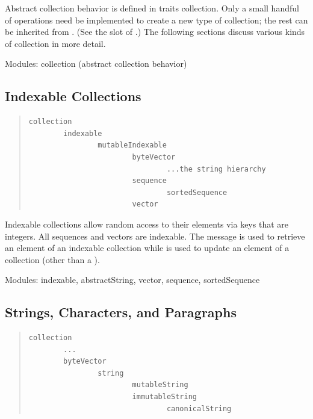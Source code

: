 \documentclass[letterpaper,10pt,english]{sphinxmanual}
\begin{document}
Abstract collection behavior is defined in traits collection. Only a small handful of operations need
be implemented to create a new type of collection; the rest can be inherited from .
(See the  slot of .) The following
sections discuss various kinds of collection in more detail.

Modules: collection (abstract collection behavior)


\subsection{Indexable Collections}
\label{collections:indexable-collections}\begin{quote}

\begin{Verbatim}[commandchars=\\\{\}]
collection
        indexable
                mutableIndexable
                        byteVector
                                ...the string hierarchy
                        sequence
                                sortedSequence
                        vector
\end{Verbatim}
\end{quote}

Indexable collections allow random access to their elements via keys that are integers. All sequences
and vectors are indexable. The message  is used to retrieve an element of an indexable collection
while  is used to update an element of a  collection (other
than a ).

Modules: indexable, abstractString, vector, sequence, sortedSequence


\subsection{Strings, Characters, and Paragraphs}
\label{collections:strings-characters-and-paragraphs}\begin{quote}

\begin{Verbatim}[commandchars=\\\{\}]
collection
        ...
        byteVector
                string
                        mutableString
                        immutableString
                                canonicalString
\end{Verbatim}
\end{quote}
\end{document}
